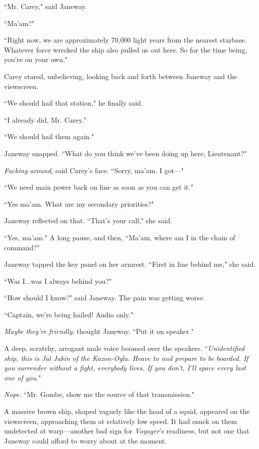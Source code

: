 \documentclass[twoside,letterpaper,12pt]{memoir}
\begin{document}
``Mr. Carey," said Janeway.

``Ma'am?"

``Right now, we are approximately 70,000 light years from the nearest starbase. Whatever force wrecked the ship also pulled us out here. So for the time being, you're on your own."

Carey stared, unbelieving, looking back and forth between Janeway and the viewscreen.

``We should hail that station," he finally said.

``I already did, Mr. Carey."

``We should hail them again."

Janeway snapped. ``What do you think we've been doing up here, Lieutenant?"

\textit{Fucking around}, said Carey's face. ``Sorry, ma'am. I got---"

``We need main power back on line as soon as you can get it."

``Yes ma'am. What are my secondary priorities?"

Janeway reflected on that. ``That's your call," she said.

``Yes, ma'am." A long pause, and then, ``Ma'am, where am I in the chain of command?"

Janeway tapped the key panel on her armrest. ``First in line behind me," she said.

``Was I...was I always behind you?"

``How should I know?" said Janeway. The pain was getting worse.

``Captain, we're being hailed! Audio only."

\textit{Maybe they're friendly}, thought Janeway. ``Put it on speaker."

A deep, scratchy, arrogant male voice boomed over the speakers. ``\textit{Unidentified ship, this is Jal Jabin of the Kazon-Ogla. Heave to and prepare to be boarded. If you surrender without a fight, everybody lives. If you don't, I'll space every last one of you.}"

\textit{Nope}. ``Mr. Gombe, show me the source of that transmission."

A massive brown ship, shaped vaguely like the head of a squid, appeared on the viewscreen, approaching them at relatively low speed. It had snuck on them undetected at warp---another bad sign for \textit{Voyager}'s readiness, but not one that Janeway could afford to worry about at the moment.
\end{document}
